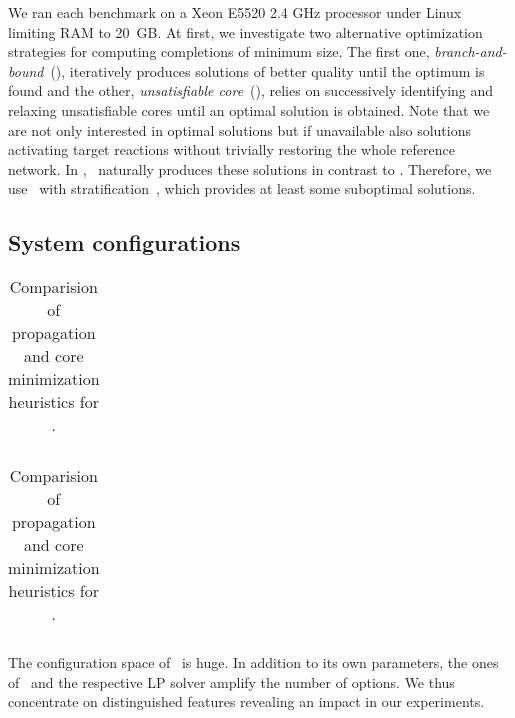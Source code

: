 We ran each benchmark on a Xeon E5520 2.4 GHz processor under Linux limiting RAM to 20~GB.
At first,
we investigate two alternative optimization strategies for computing completions of minimum size.
The first one, \emph{branch-and-bound}~(\bb), iteratively produces solutions of better quality until the optimum is found and the other,
\emph{unsatisfiable core}~(\usc), relies on successively identifying and relaxing unsatisfiable cores until an optimal solution is obtained.
Note that we are not only interested in optimal solutions
but if unavailable also solutions activating target reactions without trivially restoring the whole reference network.
In \clingo, \bb\ naturally produces these solutions in contrast to \usc.
Therefore, we use \usc\ with stratification~\citep{anbole13a}, which provides at least some suboptimal solutions.

\subsection{System configurations}
\label{sec:sysconf}
\newcommand{\shade}[2]%
{%
    \cellcolor{black!\xinttheiexpr 80*#1/#2-30\relax}%
       {#1}%
}%


    \begin{table}[t]
        \begin{center}
            \begin{tabular}{r|*{5}{c}}
				
            \end{tabular}
        \end{center}
        \caption{Comparision of propagation and core minimization heuristics for \bb. \label{tab:pchbb}}
    \end{table}


    \begin{table}[t]
        \begin{center}
            \begin{tabular}{r|*{5}{c}}
				
            \end{tabular}
        \end{center}
        \caption{Comparision of propagation and core minimization heuristics for \usc. \label{tab:pchusc}}
    \end{table}

The configuration space of \fluto\ is huge.
In addition to its own parameters, the ones of \clingo\ and the respective LP solver amplify the number of options.
We thus concentrate on distinguished features revealing an impact in our experiments.

